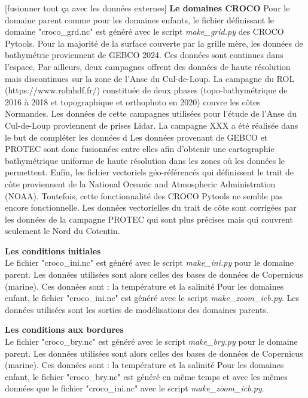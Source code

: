 \documentclass[10pt,a4paper,titlepage]{article}
\begin{document}
[fusionner tout ça avec les données externes]
\textbf{Le domaines CROCO}
Pour le domaine parent comme pour les domaines enfants, le fichier définissant le domaine "croco\_grd.nc" est généré avec le script \textit{make\_grid.py} des CROCO Pytools.
Pour la majorité de la surface couverte par la grille mère, les données de bathymétrie proviennent de GEBCO 2024.
Ces données sont continues dans l'espace.
Par ailleurs, deux campagnes offrent des données de haute résolution mais discontinues sur la zone de l'Anse du Cul-de-Loup.
La campagne du ROL (https://www.rolnhdf.fr/) constituée de deux phases (topo-bathymétrique de 2016 à 2018 et topographique et orthophoto en 2020) couvre les côtes Normandes. Les données de cette campagnes utilisées pour l'étude de l'Anse du Cul-de-Loup proviennent de prises Lidar.
La campagne XXX a été réalisée dans le but de compléter les données d
Les données provenant de GEBCO et PROTEC sont donc fusionnées entre elles afin d'obtenir une cartographie bathymétrique uniforme de haute résolution dans les zones où les données le permettent.
Enfin, les fichier vectoriels géo-référencés qui définissent le trait de côte proviennent de la National Oceanic and Atmospheric Administration (NOAA). Toutefois, cette fonctionnalité des CROCO Pytools ne semble pas encore fonctionnelle.
Les données vectorielles du trait de côte sont corrigées par les données de la campagne PROTEC qui sont plus précises mais qui couvrent seulement le Nord du Cotentin.


\textbf{Les conditions initiales}\\
\label{par:cond_init}
Le fichier "croco\_ini.nc" est généré avec le script \textit{make\_ini.py} pour le domaine parent.
Les données utilisées sont alors celles des bases de données de Copernicus (marine).
Ces données sont : la température et la salinité %
Pour les domaines enfant, le fichier "croco\_ini.nc" est généré avec le script \textit{make\_zoom\_icb.py}.
Les données utilisées sont les sorties de modélisations des domaines parents.

\textbf{Les conditions aux bordures}\\
\label{par:cond_bords}
Le fichier "croco\_bry.nc" est généré avec le script \textit{make\_bry.py} pour le domaine parent.
Les données utilisées sont alors celles des bases de données de Copernicus (marine).
Ces données sont : la température et la salinité %
Pour les domaines enfant, le fichier "croco\_bry.nc" est généré en même temps et avec les mêmes données que le fichier "croco\_ini.nc" avec le script \textit{make\_zoom\_icb.py}.
\end{document}
